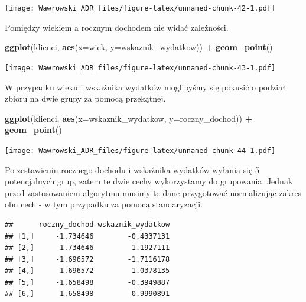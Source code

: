 \documentclass[]{book}
\newenvironment{Shaded}{\begin{snugshade}}{\end{snugshade}}
\newcommand{\DataTypeTok}[1]{\textcolor[rgb]{0.13,0.29,0.53}{#1}}
\newcommand{\KeywordTok}[1]{\textcolor[rgb]{0.13,0.29,0.53}{\textbf{#1}}}
\newcommand{\NormalTok}[1]{#1}
\newcommand{\OperatorTok}[1]{\textcolor[rgb]{0.81,0.36,0.00}{\textbf{#1}}}
\newcommand{\StringTok}[1]{\textcolor[rgb]{0.31,0.60,0.02}{#1}}
\begin{document}
\texttt{[image: Wawrowski\_ADR\_files/figure-latex/unnamed-chunk-42-1.pdf]}

Pomiędzy wiekiem a rocznym dochodem nie widać zależności.

\begin{Shaded}
\begin{Highlighting}[]
\KeywordTok{ggplot}\NormalTok{(klienci, }\KeywordTok{aes}\NormalTok{(}\DataTypeTok{x=}\NormalTok{wiek, }\DataTypeTok{y=}\NormalTok{wskaznik_wydatkow)) }\OperatorTok{+}
\StringTok{  }\KeywordTok{geom_point}\NormalTok{()}
\end{Highlighting}
\end{Shaded}

\texttt{[image: Wawrowski\_ADR\_files/figure-latex/unnamed-chunk-43-1.pdf]}

W przypadku wieku i wskaźnika wydatków moglibyśmy się pokusić o podział zbioru na dwie grupy za pomocą przekątnej.

\begin{Shaded}
\begin{Highlighting}[]
\KeywordTok{ggplot}\NormalTok{(klienci, }\KeywordTok{aes}\NormalTok{(}\DataTypeTok{x=}\NormalTok{wskaznik_wydatkow, }\DataTypeTok{y=}\NormalTok{roczny_dochod)) }\OperatorTok{+}
\StringTok{  }\KeywordTok{geom_point}\NormalTok{()}
\end{Highlighting}
\end{Shaded}

\texttt{[image: Wawrowski\_ADR\_files/figure-latex/unnamed-chunk-44-1.pdf]}

Po zestawieniu rocznego dochodu i wskaźnika wydatków wyłania się 5 potencjalnych grup, zatem te dwie cechy wykorzystamy do grupowania. Jednak przed zastosowaniem algorytmu musimy te dane przygotować normalizując zakres obu cech - w tym przypadku za pomocą standaryzacji.

\begin{Shaded}
\end{Shaded}

\begin{verbatim}
##      roczny_dochod wskaznik_wydatkow
## [1,]     -1.734646        -0.4337131
## [2,]     -1.734646         1.1927111
## [3,]     -1.696572        -1.7116178
## [4,]     -1.696572         1.0378135
## [5,]     -1.658498        -0.3949887
## [6,]     -1.658498         0.9990891
\end{verbatim}
\end{document}
